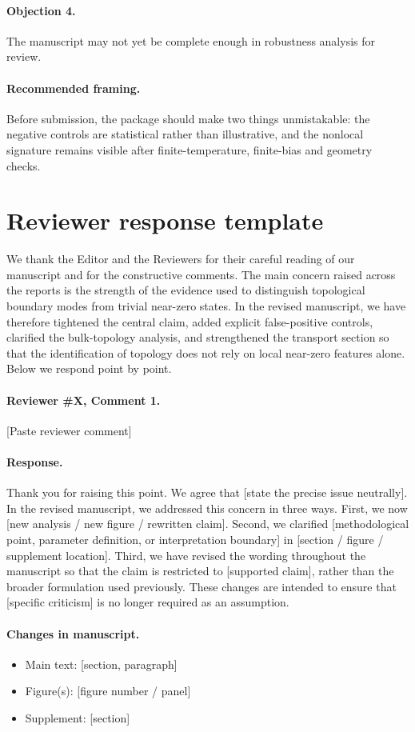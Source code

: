 \paragraph{Objection 4.}
The manuscript may not yet be complete enough in robustness analysis for review.

\paragraph{Recommended framing.}
Before submission, the package should make two things unmistakable: the negative controls are statistical rather than illustrative, and the nonlocal signature remains visible after finite-temperature, finite-bias and geometry checks.

\section*{Reviewer response template}

We thank the Editor and the Reviewers for their careful reading of our manuscript and for the constructive comments. The main concern raised across the reports is the strength of the evidence used to distinguish topological boundary modes from trivial near-zero states. In the revised manuscript, we have therefore tightened the central claim, added explicit false-positive controls, clarified the bulk-topology analysis, and strengthened the transport section so that the identification of topology does not rely on local near-zero features alone. Below we respond point by point.

\paragraph{Reviewer \#X, Comment 1.}
[Paste reviewer comment]

\paragraph{Response.}
Thank you for raising this point. We agree that [state the precise issue neutrally]. In the revised manuscript, we addressed this concern in three ways. First, we now [new analysis / new figure / rewritten claim]. Second, we clarified [methodological point, parameter definition, or interpretation boundary] in [section / figure / supplement location]. Third, we have revised the wording throughout the manuscript so that the claim is restricted to [supported claim], rather than the broader formulation used previously. These changes are intended to ensure that [specific criticism] is no longer required as an assumption.

\paragraph{Changes in manuscript.}
\begin{itemize}
\item Main text: [section, paragraph]
\item Figure(s): [figure number / panel]
\item Supplement: [section]
\end{itemize}
